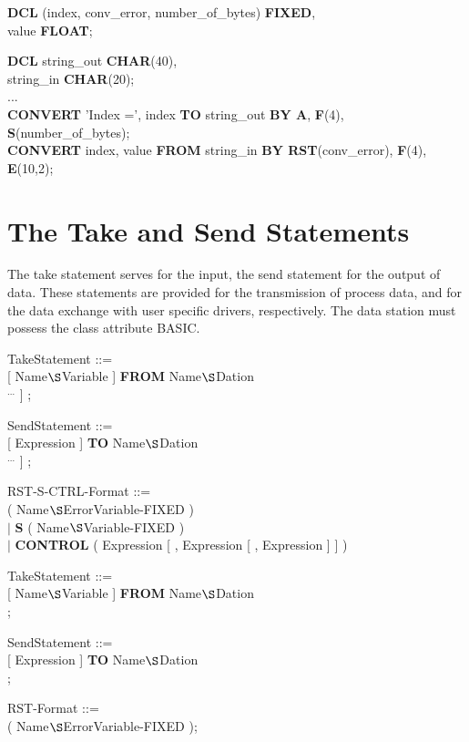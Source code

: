 \begin{removed}
\begin{tabbing}
{\bf DCL} (index, conv\_error, number\_of\_bytes) \= {\bf FIXED},\\
\x        value                                   \> {\bf FLOAT};\\
\end{tabbing}

{\bf DCL} string\_out {\bf CHAR}(40),\\
\x string\_in {\bf CHAR}(20);\\
...\\
{\bf CONVERT} 'Index =', index {\bf TO} string\_out 
    {\bf BY A}, {\bf F}(4), {\bf S}(number\_of\_bytes);\\
{\bf CONVERT} index, value {\bf FROM} string\_in {\bf BY RST}(conv\_error), {\bf F}(4), {\bf E}(10,2);
\end{removed}

\section{The Take and Send Statements}    %
\label{sec_take_send}

The take statement serves for the input, the send statement for the
output of data. These statements are provided for the transmission of
process data, and for the data exchange with user specific drivers,
respectively. The data station must possess the class attribute BASIC.

\begin{removed}
TakeStatement ::=\\
 [ Name$\S $Variable ] {\bf FROM} Name$\S $Dation\\
\x \x [ {\bf BY} RST-S-CTRL-Format [ , RST-S-CTRL-Format ] $^{...}$ ] ;

SendStatement ::=\\
 [ Expression ] {\bf TO} Name$\S $Dation\\
\x \x [ {\bf BY} RST-S-CTRL-Format [ , RST-S-CTRL-Format ] $^{...}$ ] ;

RST-S-CTRL-Format ::=\\
 ( Name$\S $ErrorVariable-FIXED )\\
\x $\mid$ {\bf S} ( Name$\S $Variable-FIXED )\\
\x $\mid$ {\bf CONTROL} ( Expression [ , Expression [ , Expression ] ] )
\end{removed}
\begin{added}
TakeStatement ::=\\
 [ Name$\S $Variable ] {\bf FROM} Name$\S $Dation\\
\x {} ;

SendStatement ::=\\
 [ Expression ] {\bf TO} Name$\S $Dation\\
\x {} ;

RST-Format ::=\\
 ( Name$\S $ErrorVariable-FIXED );
\end{added}

